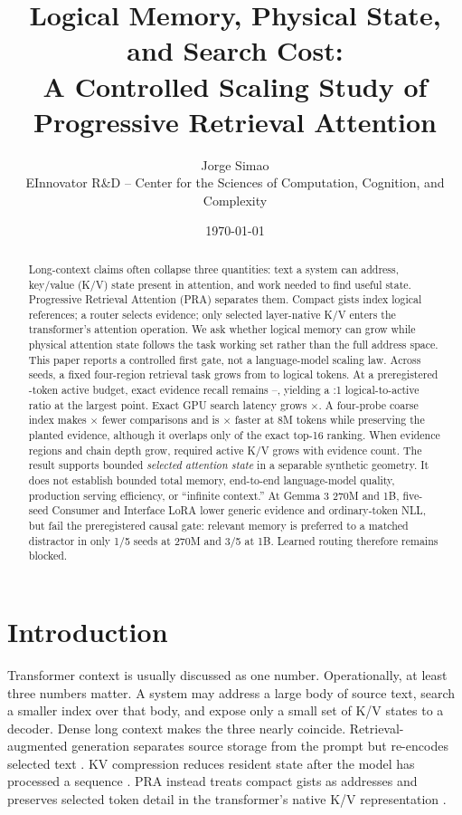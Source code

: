\documentclass[10pt]{article}
\title{Logical Memory, Physical State, and Search Cost:\\
A Controlled Scaling Study of Progressive Retrieval Attention}
\author{Jorge Simao\\EInnovator R\&D -- Center for the Sciences of Computation, Cognition, and Complexity}
\date{\today}
\begin{document}
\maketitle

\begin{abstract}
Long-context claims often collapse three quantities: text a system can address,
key/value (K/V) state present in attention, and work needed to find useful state.
Progressive Retrieval Attention (PRA) separates them. Compact gists index logical
references; a router selects evidence; only selected layer-native K/V enters the
transformer's attention operation. We ask whether logical memory can grow while
physical attention state follows the task working set rather than the full
address space. This paper reports a controlled first gate, not a language-model
scaling law. Across \PaperFiveSeedCount{} seeds, a fixed four-region retrieval
task grows from \PaperFiveLogicalMin{} to \PaperFiveLogicalMax{} logical tokens.
At a preregistered \PaperFiveActiveTokens{}-token active budget, exact evidence
recall remains \PaperFiveRecallMin{}--\PaperFiveRecallMax{}, yielding a
\PaperFiveLogicalRatio{}:1 logical-to-active ratio at the largest point. Exact
GPU search latency grows \PaperFiveExactLatencyGrowth{}$\times$. A four-probe
coarse index makes \PaperFiveComparisonReduction{}$\times$ fewer comparisons
and is \PaperFiveIndexedSpeedup{}$\times$ faster at 8M tokens while preserving
the planted evidence, although it overlaps only \PaperFiveExactOverlap{} of the
exact top-16 ranking. When evidence regions and chain depth grow, required active
K/V grows with evidence count. The result supports bounded \emph{selected
attention state} in a separable synthetic geometry. It does not establish
bounded total memory, end-to-end language-model quality, production serving
efficiency, or ``infinite context.''
At Gemma 3 270M and 1B, five-seed Consumer and Interface LoRA lower generic
evidence and ordinary-token NLL, but fail the preregistered causal gate: relevant
memory is preferred to a matched distractor in only 1/5 seeds at 270M and 3/5 at
1B. Learned routing therefore remains blocked.
\end{abstract}

\section{Introduction}

Transformer context is usually discussed as one number. Operationally, at least
three numbers matter. A system may address a large body of source text, search a
smaller index over that body, and expose only a small set of K/V states to a
decoder. Dense long context makes the three nearly coincide. Retrieval-augmented
generation separates source storage from the prompt but re-encodes selected text
\cite{lewis2020rag,karpukhin2020dpr}. KV compression reduces resident state after
the model has processed a sequence \cite{zhang2023h2o,li2024snapkv,liu2024kivi}.
PRA instead treats compact gists as addresses and preserves selected token detail
in the transformer's native K/V representation \cite{simao2026standalone,simao2026hf}.
\end{document}
